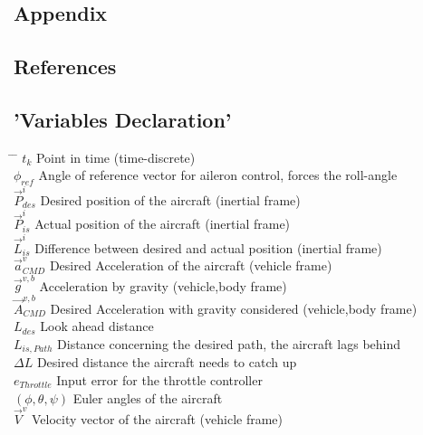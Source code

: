 \documentclass[11pt,a4paper]{scrartcl}		%
\begin{document}
\begin{appendix}
\section{Appendix}

\bigskip



\subsection{References}

\begin{flushleft}
\renewcommand{\refname}{}
\singlespacing
%
{\def\section*#1{}}
\end{flushleft}



\bigskip

\subsection{'Variables Declaration'}

\begin{tabbing}
	 \hspace{2cm} \= \hspace{2cm} \= \hspace{3cm} \kill
	\> $t_k$ \> Point in time (time-discrete)\\	
	\> $\phi_{ref}$ \> Angle of reference vector for aileron control, forces the roll-angle\\
	\> $\vec{P}_{des}^i$ \> Desired position of the aircraft (inertial frame)\\
	\> $\vec{P}_{is}^i$ \> Actual position of the aircraft (inertial frame)\\
	\> $\vec{L}_{is}^i$ \> Difference between desired and actual position (inertial frame)\\
	\> $\vec{a}_{CMD}^v$ \> Desired Acceleration of the aircraft (vehicle frame)\\
	\> $\vec{g}^{v,b}$ \> Acceleration by gravity (vehicle,body frame)\\
	\> $\vec{A}_{CMD}^{v,b}$ \> Desired Acceleration with gravity considered (vehicle,body frame)\\
	\> $L_{des}$ \> Look ahead distance \\
	\> $L_{is,Path}$ \> Distance concerning the desired path, the aircraft lags behind \\
	\> $\Delta L$ \> Desired distance the aircraft needs to catch up \\
	\> $e_{Throttle}$ \> Input error for the throttle controller \\
	\> $(\phi,\theta,\psi)$ \> Euler angles of the aircraft \\
	\> $\vec{V}^v$ \> Velocity vector of the aircraft (vehicle frame)\\	
	
\end{tabbing}


\end{appendix}
\end{document}
